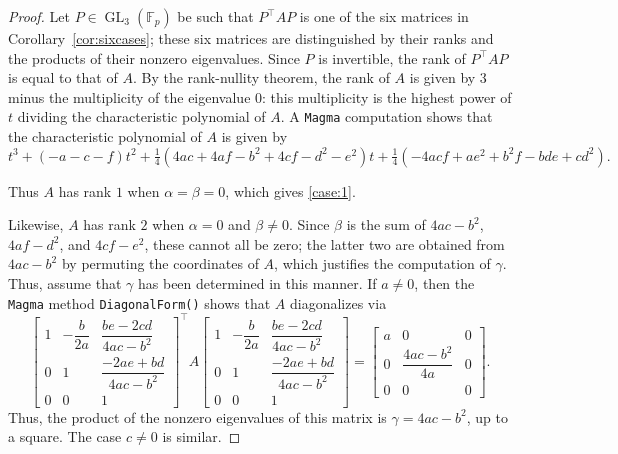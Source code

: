 \documentclass[10pt,a4paper]{amsart}
\numberwithin{equation}{section}
\numberwithin{figure}{section}
\theoremstyle{definition}
\theoremstyle{plain}
\theoremstyle{remark}
\theoremstyle{plain}
\theoremstyle{definition}
\theoremstyle{plain}
\theoremstyle{plain}
\newcommand{\F}{\mathbb{F}}
\newcommand{\GL}{\operatorname{GL}}
\begin{document}
	\begin{proof}
	Let $P\in\GL_3(\F_p)$ be such that $P^\top AP$ is one of the six matrices in Corollary~\ref{cor:sixcases}; these six matrices are distinguished by their ranks and the products of their nonzero eigenvalues. Since $P$ is invertible, the rank of $P^\top AP$ is equal to that of $A$. By the rank-nullity theorem, the rank of $A$ is given by 3 minus the multiplicity of the eigenvalue $0$: this multiplicity is the highest power of $t$ dividing the characteristic polynomial of $A$. A \texttt{Magma} \cite{magma} computation shows that the characteristic polynomial of $A$ is given by
	\begin{equation*}
	t^3+(-a-c-f)t^2+\tfrac{1}{4}(4ac+4af-b^2+4cf-d^2-e^2)t+\tfrac{1}{4}(-4acf+ae^2+b^2f-bde+cd^2).
	\end{equation*}
	
	Thus $A$ has rank $1$ when $\alpha=\beta=0$, which gives \eqref{case:1}.
	
	Likewise, $A$ has rank $2$ when $\alpha=0$ and $\beta\ne 0$. Since $\beta$ is the sum of $4ac-b^2$, $4af-d^2$, and $4cf-e^2$, these cannot all be zero; the latter two are obtained from $4ac-b^2$ by permuting the coordinates of $A$, which justifies the computation of $\gamma$. Thus, assume that $\gamma$ has been determined in this manner. If $a\ne 0$, then the \texttt{Magma} method \texttt{DiagonalForm()} shows that $A$ diagonalizes via
	\begin{equation*}
		\begin{bmatrix}
			1 & -\dfrac{b}{2a} & \dfrac{be - 2cd}{4ac - b^2}\\
			0 & 1 & \dfrac{-2ae + bd}{4ac - b^2} \\
			0 & 0 & 1
		\end{bmatrix}^\top
		A
		\begin{bmatrix}
			1 & -\dfrac{b}{2a} & \dfrac{be - 2cd}{4ac - b^2}\\
			0 & 1 & \dfrac{-2ae + bd}{4ac - b^2} \\
			0 & 0 & 1
		\end{bmatrix}
		=
		\begin{bmatrix}
		a&0&0\\
		0&\dfrac{4ac-b^2}{4a}&0\\
		0&0&0
		\end{bmatrix}.
	\end{equation*}
	Thus, the product of the nonzero eigenvalues of this matrix is $\gamma=4ac-b^2$, up to a square. The case $c\ne 0$ is similar.
	

\end{proof}
\end{document}
